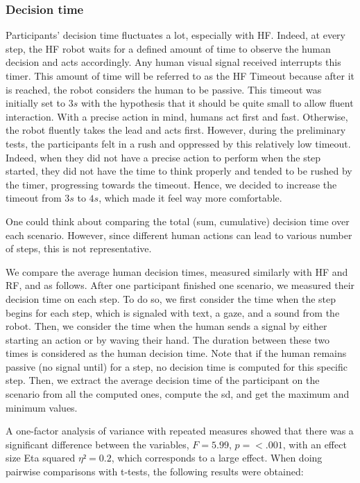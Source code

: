\subsubsection*{Decision time}
Participants' decision time fluctuates a lot, especially with HF. Indeed, at every step, the HF robot waits for a defined amount of time to observe the human decision and acts accordingly. Any human visual signal received interrupts this timer. This amount of time will be referred to as the HF Timeout because after it is reached, the robot considers the human to be passive. This timeout was initially set to $3s$ with the hypothesis that it should be quite small to allow fluent interaction. With a precise action in mind, humans act first and fast. Otherwise, the robot fluently takes the lead and acts first. However, during the preliminary tests, the participants felt in a rush and oppressed by this relatively low timeout. Indeed, when they did not have a precise action to perform when the step started, they did not have the time to think properly and tended to be rushed by the timer, progressing towards the timeout. Hence, we decided to increase the timeout from $3s$ to $4s$, which made it feel way more comfortable. 

One could think about comparing the total (sum, cumulative) decision time over each scenario. However, since different human actions can lead to various number of steps, this is not representative. 

We compare the average human decision times, measured similarly with HF and RF, and as follows. After one participant finished one scenario, we measured their decision time on each step. To do so, we first consider the time when the step begins for each step, which is signaled with text, a gaze, and a sound from the robot. Then, we consider the time when the human sends a signal by either starting an action or by waving their hand. The duration between these two times is considered as the human decision time. Note that if the human remains passive (no signal until) for a step, no decision time is computed for this specific step. Then, we extract the average decision time of the participant on the scenario from all the computed ones, compute the \acrshort{sd}, and get the maximum and minimum values. 

A one-factor analysis of variance with repeated measures showed that there was a significant difference between the variables, $F = 5.99$, $p = <.001$, with an effect size Eta squared $\eta² = 0.2$, which corresponds to a large effect.
When doing pairwise comparisons with t-tests, the following results were obtained:

